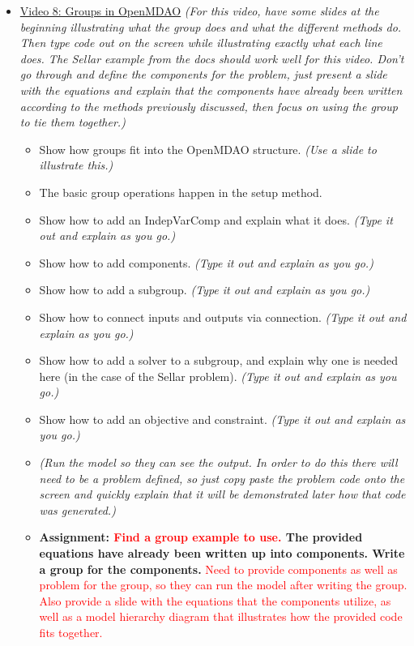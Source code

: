 \documentclass[12pt, letterpaper]{article}
\begin{document}
\begin{itemize}
	\item \underline{Video 8: Groups in OpenMDAO} \textit{(For this video, have some slides at the beginning illustrating what the group does 			and what the different methods do. Then type code out on the screen while illustrating exactly what each line does. The Sellar example from the 			docs should work well for this video. Don’t go through and define the components for the problem, just present a slide with the equations and 				explain that the components have already been written according to the methods previously discussed, then focus on using the group to tie them 		together.)}
		\begin{itemize}
			\item Show how groups fit into the OpenMDAO structure. \textit{(Use a slide to illustrate this.)}
			\item The basic group operations happen in the setup method.
			\item Show how to add an IndepVarComp and explain what it does. \textit{(Type it out and explain as you go.)}
			\item Show how to add components. \textit{(Type it out and explain as you go.)}
			\item Show how to add a subgroup. \textit{(Type it out and explain as you go.)}
			\item Show how to connect inputs and outputs via connection. \textit{(Type it out and explain as you go.)}
			\item Show how to add a solver to a subgroup, and explain why one is needed here (in the case of the Sellar problem). \textit{(Type it out and explain as you go.)}
			\item Show how to add an objective and constraint. \textit{(Type it out and explain as you go.)}
			\item \textit{(Run the model so they can see the output. In order to do this there will need to be a problem defined, so just copy paste the 				problem code onto the screen and quickly explain that it will be demonstrated later how that code was generated.)}
			\item \textbf{Assignment: \textcolor{red}{Find a group example to use.} The provided equations have already been written up into components. Write a group for the components.} \textcolor{red}{Need to provide components as well as problem for the group, so they can run the model after writing the group. Also provide a slide with the equations that the components utilize, as well as a model hierarchy diagram that illustrates how the provided code fits together.}
		\end{itemize}
		

\end{itemize}
\end{document}
